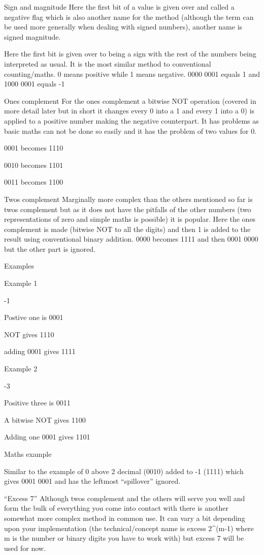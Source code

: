 \documentclass[
]{book}
\begin{document}
Sign and magnitude Here the first bit of a value is given over and called a negative flag which is also another name for the method (although the term can be used more generally when dealing with signed numbers), another name is signed magnitude.

Here the first bit is given over to being a sign with the rest of the numbers being interpreted as usual. It is the most similar method to conventional counting/maths. 0 means positive while 1 means negative. 0000 0001 equals 1 and 1000 0001 equals -1

Ones complement For the ones complement a bitwise NOT operation (covered in more detail later but in short it changes every 0 into a 1 and every 1 into a 0) is applied to a positive number making the negative counterpart. It has problems as basic maths can not be done so easily and it has the problem of two values for 0.

0001 becomes 1110

0010 becomes 1101

0011 becomes 1100

Twos complement Marginally more complex than the others mentioned so far is twos complement but as it does not have the pitfalls of the other numbers (two representations of zero and simple maths is possible) it is popular. Here the ones complement is made (bitwise NOT to all the digits) and then 1 is added to the result using conventional binary addition. 0000 becomes 1111 and then 0001 0000 but the other part is ignored.

Examples

Example 1

-1

Postive one is 0001

NOT gives 1110

adding 0001 gives 1111

Example 2

-3

Positive three is 0011

A bitwise NOT gives 1100

Adding one 0001 gives 1101

Maths example

Similar to the example of 0 above 2 decimal (0010) added to -1 (1111) which gives 0001 0001 and has the leftmost ``spillover'' ignored.

``Excess 7'' Although twos complement and the others will serve you well and form the bulk of everything you come into contact with there is another somewhat more complex method in common use. It can vary a bit depending upon your implementation (the technical/concept name is excess 2\^{}(m-1) where m is the number or binary digits you have to work with) but excess 7 will be used for now.
\end{document}
